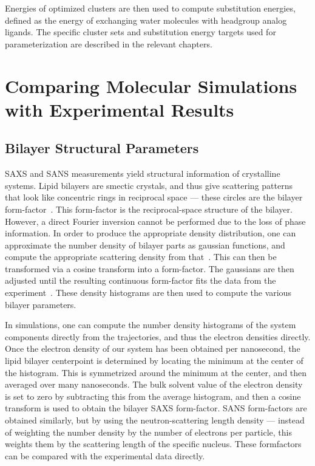 Energies of optimized clusters are then used to compute substitution
energies, defined as the energy of exchanging water molecules
with headgroup analog ligands. The specific cluster sets and substitution
energy targets used for parameterization are described in the relevant
chapters.

\section{Comparing Molecular Simulations with Experimental Results}
\subsection{Bilayer Structural Parameters}
SAXS and SANS measurements yield structural information of crystalline systems.
Lipid bilayers are smectic crystals, and thus give scattering
patterns that look like concentric rings in reciprocal space --- these circles are the bilayer form-factor~\cite{nagle:2000}. This form-factor
is the reciprocal-space structure of the bilayer. 
However, a direct Fourier inversion cannot be performed due to the loss of phase information.
In order to produce the appropriate density distribution, one can approximate the number density of bilayer parts as gaussian functions, and 
compute the appropriate scattering density from that~\cite{nagle:2000,fogarty:2015}. This can then be transformed via a cosine transform
into a form-factor. The gaussians are then adjusted
until the resulting continuous form-factor fits the data from the experiment~\cite{nagle:2000,fogarty:2015}. These density histograms are then used to compute the various bilayer parameters.

In simulations, one can compute the number density histograms of the system components
directly from the trajectories, and thus the electron densities directly. Once the electron density of our system has been obtained
per nanosecond, the lipid bilayer centerpoint is determined by locating the minimum at the center of the 
histogram. This is symmetrized around the minimum at the center, and then averaged over many nanoseconds.
The bulk solvent value of the electron density is set to zero by subtracting this from the average histogram, and then a cosine transform is used 
to obtain the bilayer SAXS form-factor. SANS form-factors are obtained similarly, but by using the neutron-scattering length density --- instead of weighting the number density 
by the number of electrons per particle, this weights them by the scattering length of the specific nucleus.
These formfactors can be compared with the experimental data directly.

